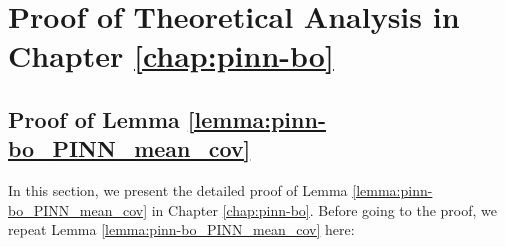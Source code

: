 \section{Proof of Theoretical Analysis in Chapter \ref{chap:pinn-bo}}
\label{section:pinn-bo_appendix}

\subsection{Proof of Lemma \ref{lemma:pinn-bo_PINN_mean_cov}}
In this section, we present the detailed proof of Lemma \ref{lemma:pinn-bo_PINN_mean_cov} in Chapter \ref{chap:pinn-bo}. Before going to the proof, we repeat Lemma \ref{lemma:pinn-bo_PINN_mean_cov} here:
\PinnMeanCov*







